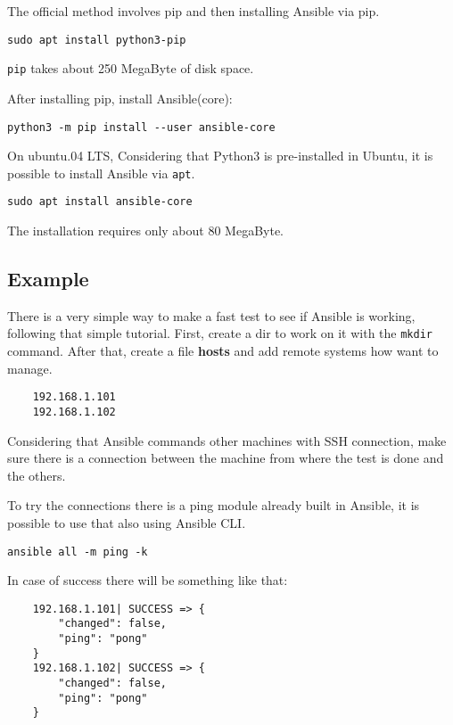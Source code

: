 \documentclass[12pt,a4paper,openright,twoside]{book}
\begin{document}
The official method involves pip and then installing Ansible via pip.
\begin{lstlisting}
sudo apt install python3-pip
\end{lstlisting}

\texttt{pip} takes about 250 MegaByte of disk space.

After installing pip, install Ansible(core):

\begin{lstlisting}
python3 -m pip install --user ansible-core
\end{lstlisting}

On ubuntu.04 LTS,
Considering that Python3 is pre-installed in Ubuntu, it is possible to install Ansible via \texttt{apt}.

\begin{lstlisting}
sudo apt install ansible-core
\end{lstlisting}

The installation requires only about 80 MegaByte.

\subsection{Example}

There is a very simple way to make a fast test to see if Ansible is working, following that simple tutorial\cite{ansibleRIP}.
First, create a dir to work on it with the \texttt{mkdir} command.
After that, create a file \textbf{hosts} and add remote systems how want to manage.
\begin{lstlisting}
    192.168.1.101
    192.168.1.102
\end{lstlisting}

Considering that Ansible commands other machines with SSH connection, make sure there is a connection between the machine from where the test is done and the others.

To try the connections there is a ping module already built in Ansible, it is possible to use that also using Ansible CLI.
\begin{lstlisting}
ansible all -m ping -k
\end{lstlisting}

In case of success there will be something like that:
\begin{lstlisting}
    192.168.1.101| SUCCESS => {
        "changed": false, 
        "ping": "pong"
    }
    192.168.1.102| SUCCESS => {
        "changed": false, 
        "ping": "pong"
    }
\end{lstlisting}
\end{document}
